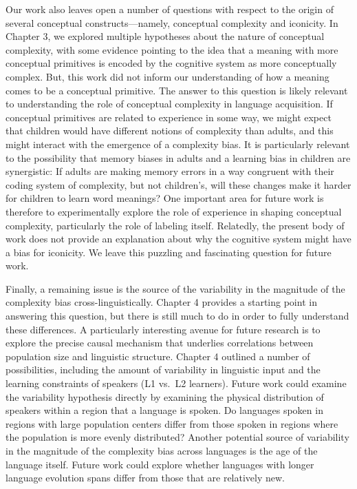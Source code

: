 Our work also leaves open a number of questions with respect to the origin of several conceptual constructs---namely, conceptual complexity and iconicity. In Chapter 3, we explored multiple hypotheses about the nature of conceptual complexity, with some evidence pointing to the idea that a meaning with more conceptual primitives is encoded by the cognitive system as more conceptually complex. But, this work did not inform our understanding of how a meaning comes to be a conceptual primitive. The answer to this question is likely relevant to understanding the role of conceptual complexity in language acquisition. If conceptual primitives are related to experience in some way, we might expect that children would have different notions of complexity than adults, and this might interact with the emergence of a complexity bias. It is particularly relevant to the possibility that memory biases in adults and a learning bias in children are synergistic: If adults are making memory errors in a way congruent with their coding system of complexity, but not children's, will these changes make it harder for children to learn word meanings? One important area for future work is therefore  to experimentally explore the role of experience in shaping conceptual complexity, particularly the role of labeling itself.  Relatedly, the present body of  work does not provide an explanation about why the cognitive system might have a bias for iconicity. We leave this puzzling and fascinating question for future work.


Finally, a remaining issue is  the source of the variability in the magnitude of the complexity bias cross-linguistically. Chapter 4 provides a starting point in answering this question, but there is still much to do in order to fully understand these differences. A particularly interesting avenue for future research is to explore the precise causal mechanism that underlies correlations between population size and linguistic structure. Chapter 4 outlined a number of possibilities, including the amount of variability in linguistic input and the learning constraints of speakers (L1 vs.\ L2 learners). Future work could examine the variability hypothesis directly by examining the physical distribution of speakers within a region that a language is spoken. Do languages spoken in regions with  large population centers differ from those spoken in regions where the population is more evenly distributed? Another potential source of variability in the magnitude of the complexity bias across languages is the age of the language itself. Future work could explore whether languages with longer language evolution spans differ from those that are relatively new. 

